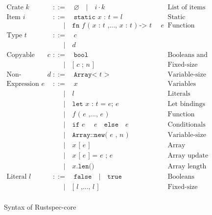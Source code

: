 \documentclass[10pt, english, a4paper]{article}
\newcommand{\rust}[1]{\texttt{#1}}
\begin{document}
\begin{figure}
\begin{align*}
\text{Crate } \rust{$k$}  &::=\quad \varnothing \quad|\quad i\cdot k &\text{List of items}\\
\text{Item } \rust{$i$}     &::=\quad \rust{static $x$ : $t$ = $l$}&\text{Static variables} \\
                            &\quad\;\;|\quad \rust{fn $f$ ( $x$ : $t$ ,..., $x$ : $t$ ) -> $t$ { $e$ }}&\text{Function}\\
\text{Type }\rust{$t$}      &::=\quad \rust{$c$}\\
                            &\quad\;\;|\quad \rust{$d$}\\
\text{Copyable type }\rust{$c$} &::=\quad \rust{bool}&\text{Booleans and integers}\\
                            &\quad\;\;|\quad \rust{[ $c$ ; $n$ ]}&\text{Fixed-size arrays}\\
\text{Non-copyable type }\rust{$d$} &::=\quad \rust{Array< $t$ >}&\text{Variable-size arrays} \\
\text{Expression }\rust{$e$}&::=\quad \rust{$x$}&\text{Variables} \\
                            &\quad\;\;|\quad\rust{$l$}&\text{Literals}\\
                            &\quad\;\;|\quad  \rust{let $x$ : $t$ = $e$; $e$}&\text{Let bindings} \\
                            &\quad\;\;|\quad \rust{$f$ ( $e$ ,..., $e$ )}&\text{Function calls} \\
                            &\quad\;\;|\quad \rust{if $e$ { $e$ } else { $e$ } }&\text{Conditionals}\\
                            &\quad\;\;|\quad \rust{Array::new( $e$ , $n$ )}&\text{Variable-size arrays}\\
                            &\quad\;\;|\quad \rust{$x$ [ $e$ ]}&\text{Array indexing}\\
                            &\quad\;\;|\quad \rust{$x$ [ $e$ ] = $e$ ; $e$}&\text{Array update}\\
                            &\quad\;\;|\quad \rust{$x$.len()}&\text{Array length}\\
\text{Literal }\rust{$l$}&::=\quad \rust{false}\quad|\quad\rust{true}&\text{Booleans}\\
                         &\quad\;\;|\quad  \rust{[ $l$ ,..., $l$ ]}&\text{Fixed-size arrays}\\
\end{align*}
\caption{Syntax of Rustspec-core\label{fig:rustspec-core-syntax}}
\end{figure}
\end{document}
